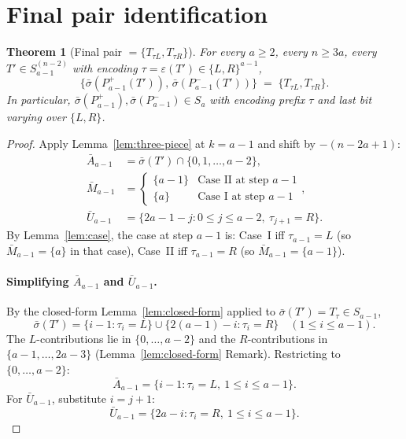 \documentclass[11pt]{article}
\newtheorem{theorem}{Theorem}
\theoremstyle{definition}
\begin{document}
\section{Final pair identification}\label{sec:main}

\begin{theorem}[Final pair $=\{T_{\tau L},T_{\tau R}\}$]\label{thm:final-pair}
For every $a\ge 2$, every $n\ge 3a$, every $T'\in S_{a-1}^{(n-2)}$
with encoding $\tau=\varepsilon(T')\in\{L,R\}^{a-1}$,
\[
   \big\{\bar\sigma(P_{a-1}^+(T')),\,\bar\sigma(P_{a-1}^-(T'))\big\}
   \;=\;\{T_{\tau L},T_{\tau R}\}.
\]
In particular, $\bar\sigma(P_{a-1}^+),\bar\sigma(P_{a-1}^-)\in S_a$
with encoding prefix $\tau$ and last bit varying over $\{L,R\}$.
\end{theorem}

\begin{proof}
Apply Lemma~\ref{lem:three-piece} at $k=a-1$ and shift by
$-(n-2a+1)$:
\begin{align*}
   \bar A_{a-1} & =\bar\sigma(T')\cap\{0,1,\ldots,a-2\}, \\
   \bar M_{a-1} & =\begin{cases}\{a-1\} & \text{Case~II at step }a-1\\
                                \{a\}   & \text{Case~I at step }a-1\end{cases}, \\
   \bar U_{a-1} & =\{2a-1-j : 0\le j\le a-2,\ \tau_{j+1}=R\}.
\end{align*}
By Lemma~\ref{lem:case}, the case at step $a-1$ is:
Case~I iff $\tau_{a-1}=L$ (so $\bar M_{a-1}=\{a\}$ in that case),
Case~II iff $\tau_{a-1}=R$ (so $\bar M_{a-1}=\{a-1\}$).

\paragraph{Simplifying $\bar A_{a-1}$ and $\bar U_{a-1}$.}
By the closed-form Lemma~\ref{lem:closed-form} applied to
$\bar\sigma(T')=T_\tau\in S_{a-1}$,
\[
   \bar\sigma(T')
   =\{i-1 : \tau_i=L\}\cup\{2(a-1)-i : \tau_i=R\}
   \quad(1\le i\le a-1).
\]
The $L$-contributions lie in $\{0,\ldots,a-2\}$ and the
$R$-contributions in $\{a-1,\ldots,2a-3\}$
(Lemma~\ref{lem:closed-form} Remark).  Restricting to
$\{0,\ldots,a-2\}$:
\[
   \bar A_{a-1}=\{i-1 : \tau_i=L,\ 1\le i\le a-1\}.
\]
For $\bar U_{a-1}$, substitute $i=j+1$:
\[
   \bar U_{a-1}=\{2a-i : \tau_i=R,\ 1\le i\le a-1\}.
\]


\end{proof}
\end{document}
